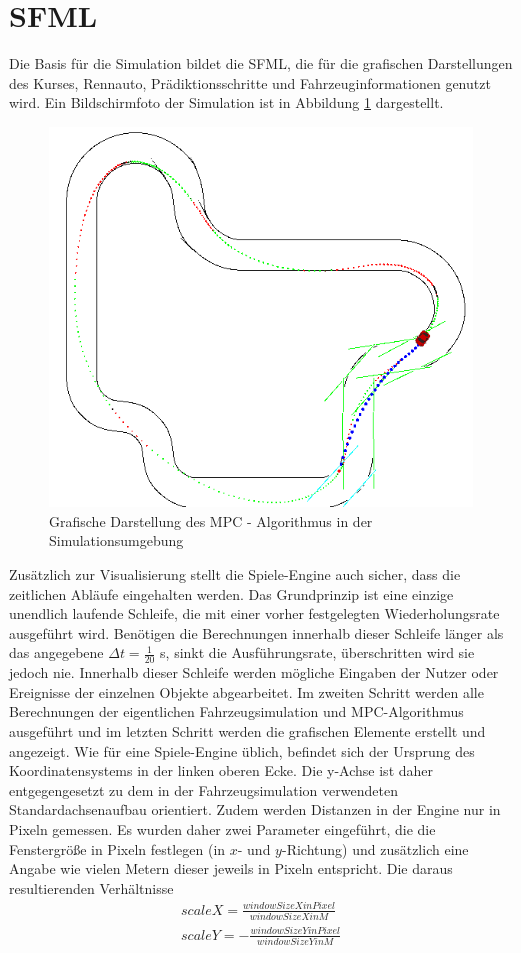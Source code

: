 \documentclass{like}
\begin{document}
\section{\acl{SFML}}
Die Basis für die Simulation bildet die \ac{SFML}, die für die grafischen Darstellungen des Kurses, Rennauto, Prädiktionsschritte und Fahr\-zeug\-in\-for\-ma\-ti\-onen genutzt wird. Ein Bildschirmfoto der Simulation ist in Abbildung \ref{fig:simVisual} dargestellt.
\begin{figure}[ht!]
	\centering
	\includegraphics[width=350pt]{Abbildungen/sim_visual.png}
	\caption{Grafische Darstellung des MPC - Algorithmus in der Simulationsumgebung}
	\label{fig:simVisual}
\end{figure} 
Zusätzlich zur Visualisierung stellt die Spiele-Engine auch sicher, dass die zeitlichen Abläufe ein\-ge\-hal\-ten werden. Das Grundprinzip ist eine einzige unendlich laufende Schleife, die mit einer vorher festgelegten Wiederholungsrate ausgeführt wird. Benötigen die Berechnungen innerhalb dieser Schleife länger als das angegebene
$\Delta t =  \frac{1}{20}$ s, sinkt die Ausführungsrate, überschritten wird sie jedoch nie. Innerhalb dieser Schleife werden mögliche Eingaben der Nutzer oder Ereignisse der einzelnen Objekte abgearbeitet. Im zweiten Schritt werden alle Berechnungen der eigentlichen Fahrzeugsimulation und \ac{MPC}-Algorithmus ausgeführt und im letzten Schritt werden die grafischen Elemente erstellt und angezeigt. Wie für eine Spiele-Engine üblich, befindet sich der Ursprung des Koordinatensystems in der linken oberen Ecke. Die y-Achse ist daher entgegengesetzt zu dem in der Fahrzeugsimulation verwendeten Standardachsenaufbau orientiert. Zudem werden Distanzen in der Engine nur in Pixeln gemessen. Es wurden daher zwei Parameter eingeführt, die die Fenstergröße in Pixeln festlegen (in \(x\)- und  \(y\)-Richtung) und zusätzlich eine Angabe wie vielen Metern dieser jeweils in Pixeln entspricht. Die daraus resultierenden Verhältnisse 
\begin{eqnarray}
	scaleX = \frac{windowSizeXinPixel}{windowSizeXinM} \\
	scaleY = - \frac{windowSizeYinPixel}{windowSizeYinM} 
\end{eqnarray}
\end{document}
